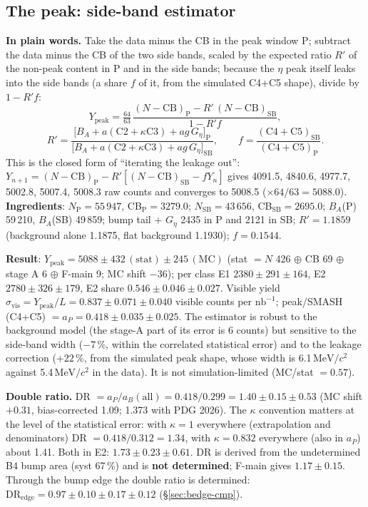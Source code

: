 \documentclass[11pt,a4paper]{article}
\newcommand{\nbinv}{\ensuremath{\mathrm{nb}^{-1}}\xspace}
\newcommand{\MeVcc}{\ensuremath{\mathrm{MeV}/c^{2}}\xspace}
\newcommand{\aP}{\ensuremath{a_P}\xspace}
\newcommand{\Ypeak}{\ensuremath{Y_{\mathrm{peak}}}\xspace}
\newcommand{\Geta}{\ensuremath{G_\eta}\xspace}
\begin{document}
\subsection{The peak: side-band estimator}
\textbf{In plain words.} Take the data minus the CB in the peak window P; subtract the data minus the CB of the two side bands, scaled by the
expected ratio $R'$ of the non-peak content in P and in the side bands; because the $\eta$ peak itself leaks into the side bands (a share $f$
of it, from the simulated C4+C5 shape), divide by $1-R'f$:
\begin{equation}
Y_{\mathrm{peak}}=\tfrac{64}{63}\,\frac{(N-\mathrm{CB})_{\mathrm{P}}-R'\,(N-\mathrm{CB})_{\mathrm{SB}}}{1-R'f},
\label{eq:sb}
\end{equation}
\[
R'=\frac{\big[B_A+a(\mathrm{C2}+\kappa\mathrm{C3})+ag\,G_\eta\big]_{\mathrm{P}}}{\big[B_A+a(\mathrm{C2}+\kappa\mathrm{C3})+ag\,G_\eta\big]_{\mathrm{SB}}},\qquad
f=\frac{(\mathrm{C4}+\mathrm{C5})_{\mathrm{SB}}}{(\mathrm{C4}+\mathrm{C5})_{\mathrm{P}}}.
\]
This is the closed form of ``iterating the leakage out'': $Y_{n+1}=(N-\mathrm{CB})_{\mathrm{P}}-R'[(N-\mathrm{CB})_{\mathrm{SB}}-fY_n]$ gives
4091.5, 4840.6, 4977.7, 5002.8, 5007.4, 5008.3 raw counts and converges to 5008.5 ($\times64/63=5088.0$). \textbf{Ingredients}:
$N_{\mathrm{P}}=55\,947$, CB$_{\mathrm{P}}=3279.0$; $N_{\mathrm{SB}}=43\,656$, CB$_{\mathrm{SB}}=2695.0$; $B_A$(P) 59\,210, $B_A$(SB) 49\,859;
bump tail + \Geta 2435 in P and 2121 in SB; $R'=1.1859$ (background alone 1.1875, flat background 1.1930); $f=0.1544$.

\textbf{Result}: $\Ypeak=5088\pm432\,(\mathrm{stat})\pm245\,(\mathrm{MC})$ (stat $=N$ 426 $\oplus$ CB 69 $\oplus$ stage A 6 $\oplus$ F-main 9;
MC shift $-36$); per class E1 $2380\pm291\pm164$, E2 $2780\pm326\pm179$, E2 share $0.546\pm0.046\pm0.027$. Visible yield
$\sigma_{\mathrm{vis}}=\Ypeak/L=0.837\pm0.071\pm0.040$ visible counts per \nbinv; peak/SMASH (C4+C5) $=\aP=0.418\pm0.035\pm0.025$. The estimator is robust to the background model (the stage-A part
of its error is 6 counts) but sensitive to the side-band width ($-7$\,\%, within the correlated statistical error) and to the leakage
correction ($+22$\,\%, from the simulated peak shape, whose width is 6.1\,\MeVcc against 5.4\,\MeVcc in the data). It is not
simulation-limited (MC/stat $=0.57$).

\textbf{Double ratio.} DR $=\aP/a_B(\mathrm{all})=0.418/0.299=1.40\pm0.15\pm0.53$ (MC shift $+0.31$, bias-corrected 1.09; 1.373 with
PDG 2026). The $\kappa$ convention matters at the level of the statistical error: with $\kappa=1$ everywhere (extrapolation and denominators)
DR $=0.418/0.312=1.34$, with $\kappa=0.832$ everywhere (also in \aP) about 1.41. Both in E2: $1.73\pm0.23\pm0.61$. DR is derived from the
undetermined B4 bump area (syst 67\,\%) and is \textbf{not determined}; F-main gives $1.17\pm0.15$. Through the bump edge the double ratio is
determined: $\mathrm{DR}_{\mathrm{edge}}=0.97\pm0.10\pm0.17\pm0.12$ (\S\ref{sec:bedge-cmp}).
\end{document}
